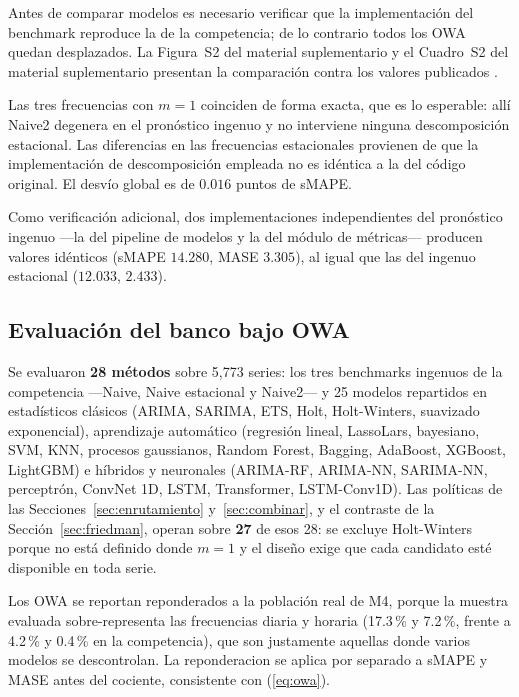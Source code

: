 Antes de comparar modelos es necesario verificar que la implementación del
benchmark reproduce la de la competencia; de lo contrario todos los OWA quedan
desplazados. La Figura~S2 del material suplementario y el Cuadro~S2 del material suplementario presentan la
comparación contra los valores publicados \cite{makridakis2020}.





Las tres frecuencias con $m=1$ coinciden de forma exacta, que es lo esperable:
allí Naive2 degenera en el pronóstico ingenuo y no interviene ninguna
descomposición estacional. Las diferencias en las frecuencias estacionales
provienen de que la implementación de descomposición empleada no es idéntica a la
del código original. El desvío global es de $0.016$ puntos de sMAPE.

Como verificación adicional, dos implementaciones independientes del pronóstico
ingenuo ---la del pipeline de modelos y la del módulo de métricas--- producen
valores idénticos (sMAPE $14.280$, MASE $3.305$), al igual que las del ingenuo
estacional ($12.033$, $2.433$).

\subsection{Evaluación del banco bajo OWA}\label{sec:evaluacion}

Se evaluaron \textbf{28 métodos} sobre 5{,}773 series: los tres benchmarks ingenuos de la
competencia ---Naive, Naive estacional y Naive2--- y 25 modelos repartidos en estadísticos
clásicos (ARIMA, SARIMA, ETS, Holt, Holt-Winters, suavizado exponencial), aprendizaje
automático (regresión lineal, LassoLars, bayesiano, SVM, KNN, procesos gaussianos, Random
Forest, Bagging, AdaBoost, XGBoost, LightGBM) e híbridos y neuronales (ARIMA-RF, ARIMA-NN,
SARIMA-NN, perceptrón, ConvNet 1D, LSTM, Transformer, LSTM-Conv1D). Las políticas de las
Secciones~\ref{sec:enrutamiento} y~\ref{sec:combinar}, y el contraste de la
Sección~\ref{sec:friedman}, operan sobre \textbf{27} de esos 28: se excluye Holt-Winters
porque no está definido donde $m=1$ y el diseño exige que cada candidato esté disponible
en toda serie.

Los OWA se reportan reponderados a la población real de M4, porque la muestra
evaluada sobre-representa las frecuencias diaria y horaria (17.3\,\% y 7.2\,\%,
frente a 4.2\,\% y 0.4\,\% en la competencia), que son justamente aquellas donde
varios modelos se descontrolan. La reponderacion se aplica por separado a sMAPE y
MASE antes del cociente, consistente con (\ref{eq:owa}).



